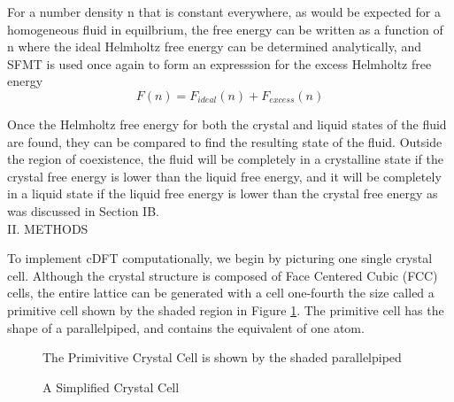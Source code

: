 \documentclass[12pt]{article}
\begin{document}
For a number density n that is constant everywhere, as would be expected for a homogeneous fluid in equilbrium, the free energy can be written as a function of n where the ideal Helmholtz free energy can be determined analytically, and SFMT is used once again to form an expresssion for the excess Helmholtz free energy
\begin{equation}{F(n)=F_{ideal}(n) + F_{excess}(n)}\end{equation} 

Once the Helmholtz free energy for both the crystal and liquid states of the fluid are found, they can be compared to find the resulting state of the fluid. Outside the region of coexistence, the fluid will be completely in a crystalline state if the crystal free energy is lower than the liquid free energy, and it will be completely in a liquid state if the liquid free energy is lower than the crystal free energy as was discussed in Section IB. 
\[{}\]
II. METHODS

To implement cDFT computationally, we begin by picturing one single crystal cell. Although the crystal structure is composed of Face Centered Cubic (FCC) cells, the entire lattice can be generated with a cell one-fourth the size called a primitive cell shown by the shaded region in Figure \ref{fig:primitivecell}. The primitive cell has the shape of a parallelpiped, and contains the equivalent of one atom.
 
  \begin{figure}[h!]
    \centering
    \caption{The Primivitive Crystal Cell is shown by the shaded parallelpiped}
    \label{fig:primitivecell}
  \end{figure}


  \begin{figure}[h!]
    \centering
    \caption{A Simplified Crystal Cell}
    \label{fig:simplecell}
  \end{figure}
\end{document}
